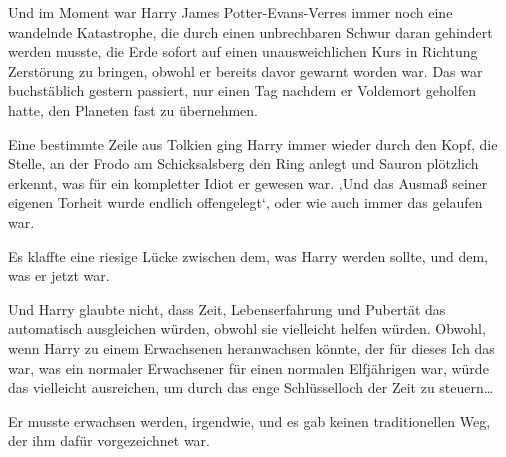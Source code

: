 Und im Moment war Harry James Potter-Evans-Verres immer noch eine wandelnde Katastrophe, die durch einen unbrechbaren Schwur daran gehindert werden musste, die Erde sofort auf einen unausweichlichen Kurs in Richtung Zerstörung zu bringen, obwohl er bereits davor gewarnt worden war. Das war buchstäblich gestern passiert, nur einen Tag nachdem er Voldemort geholfen hatte, den Planeten fast zu übernehmen.

Eine bestimmte Zeile aus Tolkien ging Harry immer wieder durch den Kopf, die Stelle, an der Frodo am Schicksalsberg den Ring anlegt und Sauron plötzlich erkennt, was für ein kompletter Idiot er gewesen war.
‚Und das Ausmaß seiner eigenen Torheit wurde endlich offengelegt‘,
oder wie auch immer das gelaufen war.

Es klaffte eine riesige Lücke zwischen dem, was Harry werden sollte, und dem, was er jetzt war.

Und Harry glaubte nicht, dass Zeit, Lebenserfahrung und Pubertät das automatisch ausgleichen würden, obwohl sie vielleicht helfen würden. Obwohl, wenn Harry zu einem Erwachsenen heranwachsen könnte, der für dieses Ich das war, was ein normaler Erwachsener für einen normalen Elfjährigen war, würde das vielleicht ausreichen, um durch das enge Schlüsselloch der Zeit zu steuern…

Er musste erwachsen werden, irgendwie, und es gab keinen traditionellen Weg, der ihm dafür vorgezeichnet war.

